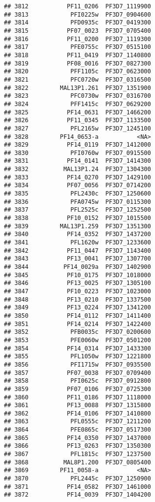 \documentclass[12pt, a4paper]{article}\usepackage[]{graphicx}\usepackage[]{color}
\makeatletter
\newenvironment{kframe}{%
 \def\at@end@of@kframe{}%
 \ifinner\ifhmode%
  \def\at@end@of@kframe{\end{minipage}}%
  \begin{minipage}{\columnwidth}%
 \fi\fi%
 \def\FrameCommand##1{\hskip\@totalleftmargin \hskip-\fboxsep
 \colorbox{shadecolor}{##1}\hskip-\fboxsep
     \hskip-\linewidth \hskip-\@totalleftmargin \hskip\columnwidth}%
 \MakeFramed {\advance\hsize-\width
   \@totalleftmargin\z@ \linewidth\hsize
   \@setminipage}}%
 {\par\unskip\endMakeFramed%
 \at@end@of@kframe}
\newenvironment{knitrout}{}{} %
\makeatother
\begin{document}
\begin{knitrout}
\begin{kframe}
\begin{verbatim}
## 3812           PF11_0206  PF3D7_1119900
## 3813            PFI0225w  PF3D7_0904600
## 3814            PFD0935c  PF3D7_0419300
## 3815           PF07_0023  PF3D7_0705400
## 3816           PF11_0200  PF3D7_1119300
## 3817            PFE0755c  PF3D7_0515100
## 3818           PF11_0419  PF3D7_1140800
## 3819           PF08_0016  PF3D7_0827300
## 3820            PFF1105c  PF3D7_0623000
## 3821            PFC0720w  PF3D7_0316500
## 3822         MAL13P1.261  PF3D7_1351900
## 3823            PFC0730w  PF3D7_0316700
## 3824            PFF1415c  PF3D7_0629200
## 3825           PF14_0631  PF3D7_1466200
## 3826           PF11_0345  PF3D7_1133500
## 3827            PFL2165w  PF3D7_1245100
## 3828         PF14_0653-a           <NA>
## 3829           PF14_0119  PF3D7_1412000
## 3830            PFI0760w  PF3D7_0915500
## 3831           PF14_0141  PF3D7_1414300
## 3832          MAL13P1.24  PF3D7_1304300
## 3833           PF14_0270  PF3D7_1429100
## 3834           PF07_0056  PF3D7_0714200
## 3835            PFL2430c  PF3D7_1250600
## 3836            PFA0745w  PF3D7_0115300
## 3837            PFL2525c  PF3D7_1252500
## 3838           PF10_0152  PF3D7_1015500
## 3839         MAL13P1.259  PF3D7_1351300
## 3840           PF14_0352  PF3D7_1437200
## 3841            PFL1620w  PF3D7_1233600
## 3842           PF11_0447  PF3D7_1143400
## 3843           PF13_0041  PF3D7_1307700
## 3844          PF14_0029a  PF3D7_1402900
## 3845           PF10_0175  PF3D7_1018000
## 3846           PF13_0025  PF3D7_1305100
## 3847           PF10_0223  PF3D7_1023000
## 3848           PF13_0210  PF3D7_1337500
## 3849           PF13_0224  PF3D7_1341200
## 3850           PF14_0112  PF3D7_1411400
## 3851           PF14_0214  PF3D7_1422400
## 3852            PFB0035c  PF3D7_0200600
## 3853            PFE0060w  PF3D7_0501200
## 3854           PF14_0314  PF3D7_1433300
## 3855            PFL1050w  PF3D7_1221800
## 3856            PFI1715w  PF3D7_0935500
## 3857           PF07_0038  PF3D7_0709400
## 3858            PFI0625c  PF3D7_0912800
## 3859           PF07_0106  PF3D7_0725300
## 3860           PF11_0186  PF3D7_1118000
## 3861           PF13_0088  PF3D7_1315800
## 3862           PF14_0106  PF3D7_1410800
## 3863            PFL0555c  PF3D7_1211200
## 3864            PFE0865c  PF3D7_0517300
## 3865           PF14_0350  PF3D7_1437000
## 3866           PF13_0263  PF3D7_1350300
## 3867            PFL1815c  PF3D7_1237500
## 3868          MAL8P1.200  PF3D7_0805400
## 3869         PF11_0058-a           <NA>
## 3870            PFL2445c  PF3D7_1250900
## 3871           PF14_0582  PF3D7_1461000
## 3872           PF14_0039  PF3D7_1404200

\end{verbatim}
\end{kframe}
\end{knitrout}
\end{document}
